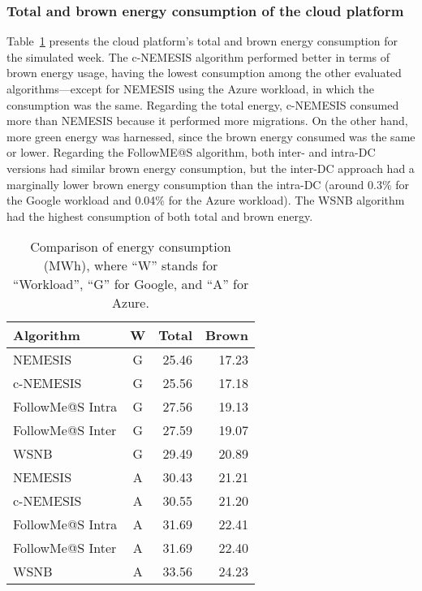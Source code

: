 \subsubsection{Total and brown energy consumption of the cloud platform}
\label{sec:energy_smartgreens}

Table~\ref{tab:total_energy_cons} presents the cloud platform's total and brown energy consumption for the simulated week. The c-NEMESIS algorithm performed better in terms of brown energy usage, having the lowest consumption among the other evaluated algorithms---except for NEMESIS using the Azure workload, in which the consumption was the same. Regarding the total energy, c-NEMESIS consumed more than NEMESIS because it performed more migrations. On the other hand, more green energy was harnessed, since the brown energy consumed was the same or lower. Regarding the FollowME@S algorithm, both inter- and intra-DC versions had similar brown energy consumption, but the inter-DC approach had a marginally lower brown energy consumption than the intra-DC (around 0.3\% for the Google workload and 0.04\% for the Azure workload). The WSNB algorithm had the highest consumption of both total and brown energy.

\begin{table}[h]
\caption{Comparison of energy consumption (MWh), where ``W'' stands for ``Workload'', ``G'' for Google, and ``A'' for Azure.}\label{tab:total_energy_cons} \centering
\begin{tabular}{|l|c|r|r|}
  \hline
  \textbf{Algorithm} & \textbf{W} & \textbf{Total} &  \textbf{Brown} \\
  \hline  
  NEMESIS  & G & 25.46 & 17.23 \\
  \hline
  c-NEMESIS & G & 25.56 & 17.18 \\
  \hline
  FollowMe@S Intra  & G & 27.56 & 19.13 \\
  \hline
  FollowMe@S Inter  & G & 27.59 & 19.07 \\
  \hline
  WSNB  & G & 29.49 & 20.89 \\
  \hline
  NEMESIS  & A  & 30.43 & 21.21 \\
  \hline
  c-NEMESIS & A  & 30.55 & 21.20 \\
  \hline
  FollowMe@S Intra  & A  & 31.69 & 22.41 \\
  \hline
  FollowMe@S Inter  & A  & 31.69 & 22.40 \\
  \hline
  WSNB & A   & 33.56 & 24.23 \\
  \hline
\end{tabular}
\end{table}


